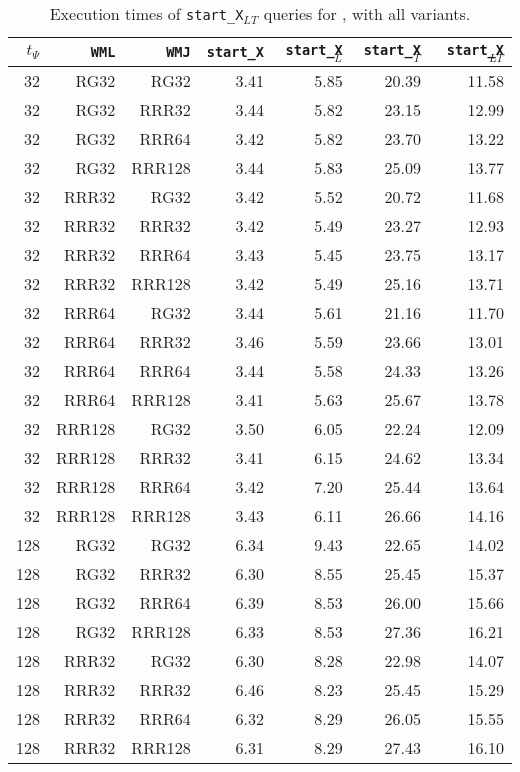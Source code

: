 \begin{table}
\caption{Execution times of \texttt{start\_X$_{LT}$} queries for \ctr, with all variants.}
\begin{tabular}{|r|r|r|r|r|r|r|}
\hline
$t_{\Psi}$ & \texttt{WML} & \texttt{WMJ} & \texttt{start\_X} & \texttt{start\_X$_{L}$} & \texttt{start\_X$_{T}$} & \texttt{start\_X$_{LT}$} \\
\hline
32 & RG32 & RG32 & 3.41 & 5.85 & 20.39 & 11.58 \\
32 & RG32 & RRR32 & 3.44 & 5.82 & 23.15 & 12.99 \\
32 & RG32 & RRR64 & 3.42 & 5.82 & 23.70 & 13.22 \\
32 & RG32 & RRR128 & 3.44 & 5.83 & 25.09 & 13.77 \\
32 & RRR32 & RG32 & 3.42 & 5.52 & 20.72 & 11.68 \\
32 & RRR32 & RRR32 & 3.42 & 5.49 & 23.27 & 12.93 \\
32 & RRR32 & RRR64 & 3.43 & 5.45 & 23.75 & 13.17 \\
32 & RRR32 & RRR128 & 3.42 & 5.49 & 25.16 & 13.71 \\
32 & RRR64 & RG32 & 3.44 & 5.61 & 21.16 & 11.70 \\
32 & RRR64 & RRR32 & 3.46 & 5.59 & 23.66 & 13.01 \\
32 & RRR64 & RRR64 & 3.44 & 5.58 & 24.33 & 13.26 \\
32 & RRR64 & RRR128 & 3.41 & 5.63 & 25.67 & 13.78 \\
32 & RRR128 & RG32 & 3.50 & 6.05 & 22.24 & 12.09 \\
32 & RRR128 & RRR32 & 3.41 & 6.15 & 24.62 & 13.34 \\
32 & RRR128 & RRR64 & 3.42 & 7.20 & 25.44 & 13.64 \\
32 & RRR128 & RRR128 & 3.43 & 6.11 & 26.66 & 14.16 \\
128 & RG32 & RG32 & 6.34 & 9.43 & 22.65 & 14.02 \\
128 & RG32 & RRR32 & 6.30 & 8.55 & 25.45 & 15.37 \\
128 & RG32 & RRR64 & 6.39 & 8.53 & 26.00 & 15.66 \\
128 & RG32 & RRR128 & 6.33 & 8.53 & 27.36 & 16.21 \\
128 & RRR32 & RG32 & 6.30 & 8.28 & 22.98 & 14.07 \\
128 & RRR32 & RRR32 & 6.46 & 8.23 & 25.45 & 15.29 \\
128 & RRR32 & RRR64 & 6.32 & 8.29 & 26.05 & 15.55 \\
128 & RRR32 & RRR128 & 6.31 & 8.29 & 27.43 & 16.10 \\

\end{tabular}
\end{table}
